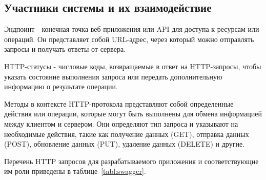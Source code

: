 \subsection{Участники системы и их взаимодействие}

Эндпоинт - конечная точка веб-приложения или API для доступа к ресурсам или операций.
Он представляет собой URL-адрес, через который можно отправлять запросы и получать ответы от сервера.

HTTP-статусы - числовые коды, возвращаемые в ответ на HTTP-запросы,
чтобы указать состояние выполнения запроса или передать дополнительную информацию о результате операции.


Методы в контексте HTTP-протокола представляют собой определенные действия или операции,
которые могут быть выполнены для обмена информацией между клиентом и сервером.
Они определяют тип запроса и указывают на необходимые действия, такие как получение данных (GET), отправка данных (POST), обновление данных (PUT), удаление данных (DELETE) и другие.

Перечень HTTP запросов для разрабатываемого приложения и соответствующие им роли приведены в таблице~\ref{tabl:swagger}.

